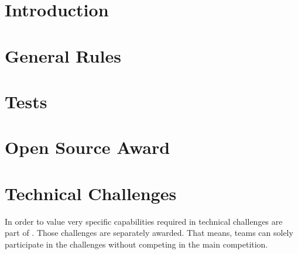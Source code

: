 \documentclass[11pt, twoside, openright, a4paper, chapterprefix]{scrbook}
\begin{document}


	
	


\pagestyle{empty}
\tableofcontents
\clearpage

\pagestyle{plain}

\chapter{Introduction}









\chapter{General Rules}




\chapter{Tests}




\chapter{Open Source Award}


\chapter{Technical Challenges} \label{cha:TechnicalChallenges}
In order to value very specific capabilities required in \RCAW technical challenges are part of \RCAW. Those challenges are separately awarded. That means, teams can solely participate in the challenges without competing in the main competition. 
\end{document}
